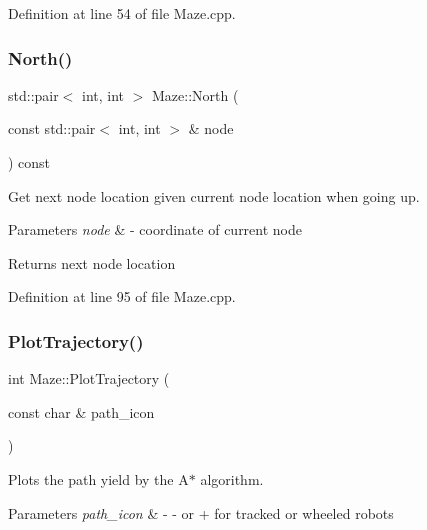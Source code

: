 Definition at line 54 of file Maze.\+cpp.

\mbox{\label{class_maze_a17057893cca3bd647794171bd7bfb577}} 
\subsubsection{\texorpdfstring{North()}{North()}}
{\footnotesize\ttfamily std\+::pair$<$ int, int $>$ Maze\+::\+North (\begin{DoxyParamCaption}\item[{const std\+::pair$<$ int, int $>$ \&}]{node }\end{DoxyParamCaption}) const}



Get next node location given current node location when going up. 


\begin{DoxyParams}{Parameters}
{\em node} & -\/ coordinate of current node \\
\hline
\end{DoxyParams}
\begin{DoxyReturn}{Returns}
next node location 
\end{DoxyReturn}


Definition at line 95 of file Maze.\+cpp.

\mbox{\label{class_maze_aa5b63e5c120410dda38853a443022b52}} 
\subsubsection{\texorpdfstring{PlotTrajectory()}{PlotTrajectory()}}
{\footnotesize\ttfamily int Maze\+::\+Plot\+Trajectory (\begin{DoxyParamCaption}\item[{const char \&}]{path\+\_\+icon }\end{DoxyParamCaption})}



Plots the path yield by the A$\ast$ algorithm. 


\begin{DoxyParams}{Parameters}
{\em path\+\_\+icon} & -\/ -\/ or + for tracked or wheeled robots \\
\hline
\end{DoxyParams}


